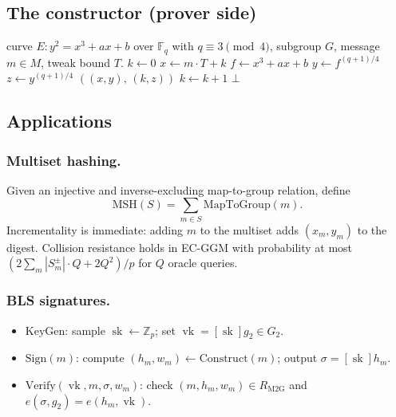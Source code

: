 \documentclass[11pt,a4paper]{article}
\theoremstyle{definition}
\newcommand{\F}{\mathbb{F}}
\newcommand{\Z}{\mathbb{Z}}
\DeclareMathOperator{\sk}{sk}
\DeclareMathOperator{\vk}{vk}
\begin{document}
\subsection{The constructor (prover side)}

\begin{algorithm}[H]
\caption{GMMZ x-Increment Constructor}
\label{alg:x-inc-construct}
\begin{algorithmic}[1]
\Require curve $E : y^2 = x^3+ax+b$ over $\F_q$ with $q \equiv 3 \pmod 4$,
subgroup $G$, message $m \in M$, tweak bound $T$.
\State $k \gets 0$
  \State $x \gets m \cdot T + k$
  \State $f \gets x^3 + a x + b$
  \If{$f^{(q-1)/2} = 1$ in $\F_q$}
     \State $y \gets f^{(q+1)/4}$
     \State $z \gets y^{(q+1)/4}$
        \State \Return $((x,y),\,(k,z))$
     \EndIf
  \EndIf
  \State $k \gets k+1$
\EndWhile
\State \Return $\bot$ 
\end{algorithmic}
\end{algorithm}

\subsection{Applications}

\subsubsection*{Multiset hashing.}
Given an injective and inverse-excluding map-to-group relation, define
\[
  \mathrm{MSH}(S) = \sum_{m \in S} \mathrm{MapToGroup}(m).
\]
Incrementality is immediate: adding $m$ to the multiset adds $(x_m,y_m)$ to
the digest. Collision resistance holds in EC-GGM with probability at most
$(2 \sum_m |S_m^\pm| \cdot Q + 2Q^2)/p$ for $Q$ oracle queries.

\subsubsection*{BLS signatures.}
\begin{itemize}
  \item $\mathrm{KeyGen}$: sample $\sk \leftarrow \Z_p$; set
  $\vk = [\sk] g_2 \in G_2$.
  \item $\mathrm{Sign}(m)$: compute $(h_m, w_m) \gets
  \mathrm{Construct}(m)$; output $\sigma = [\sk] h_m$.
  \item $\mathrm{Verify}(\vk, m, \sigma, w_m)$: check $(m, h_m, w_m) \in
  R_{\text{M2G}}$ and $e(\sigma, g_2) = e(h_m, \vk)$.
\end{itemize}
\end{document}
